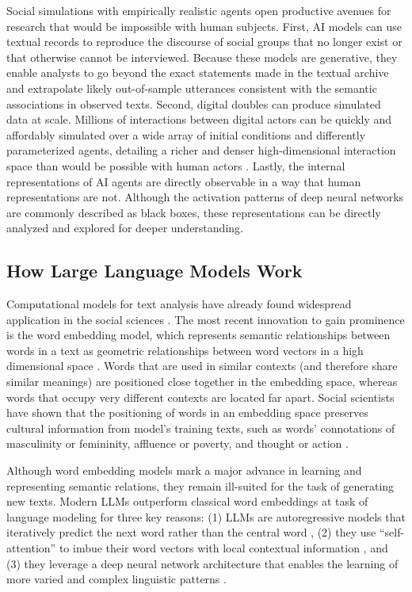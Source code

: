 \documentclass{article}
\begin{document}
Social simulations with empirically realistic agents open productive
avenues for research that would be impossible with human subjects.
First, AI models can use textual records to reproduce the discourse of
social groups that no longer exist or that otherwise cannot be
interviewed. Because these models are generative, they enable analysts
to go beyond the exact statements made in the textual archive and
extrapolate likely out-of-sample utterances consistent with the semantic
associations in observed texts. Second, digital doubles can produce
simulated data at scale. Millions of interactions between digital actors
can be quickly and affordably simulated over a wide array of initial
conditions and differently parameterized agents, detailing a richer and
denser high-dimensional interaction space than would be possible with
human actors \parencite{Lai2024-qg}. Lastly, the internal representations of AI agents are directly
observable in a way that human representations are not. Although the
activation patterns of deep neural networks are commonly described as
black boxes, these representations can be directly analyzed and explored
for deeper understanding.

\subsection*{How Large Language Models Work}

Computational models for text analysis have already found widespread
application in the social sciences
\parencite{Gentzkow2019-vu, Grimmer2022-fu}. The most recent innovation to gain
prominence is the word embedding model, which represents semantic
relationships between words in a text as geometric relationships between
word vectors in a high dimensional space
\parencite{Mikolov2013-va,
Pennington2014-dz}. Words that are used in similar
contexts (and therefore share similar meanings) are positioned close
together in the embedding space, whereas words that occupy very
different contexts are located far apart. Social scientists have shown
that the positioning of words in an embedding space preserves cultural
information from model's training texts, such as words' connotations of
masculinity or femininity, affluence or poverty, and thought or action
\parencite{Boutyline2023-sr, Garg2018-jf, Kozlowski2019-vh, Stoltz2019-mx}.

Although word embedding models mark a major advance in learning and
representing semantic relations, they remain ill-suited for the task of
generating new texts. Modern LLMs outperform classical word embeddings
at task of language modeling for three key reasons: (1) LLMs are
autoregressive models that iteratively predict the next word rather than
the central word \parencite{Brown2020-nh}, (2) they use ``self-attention'' to imbue their word vectors
with local contextual information \parencite{Vaswani2017-wi}, and
(3) they leverage a deep neural network architecture that enables the
learning of more varied and complex linguistic patterns \parencite{Kaplan2020-lo}.
\end{document}
